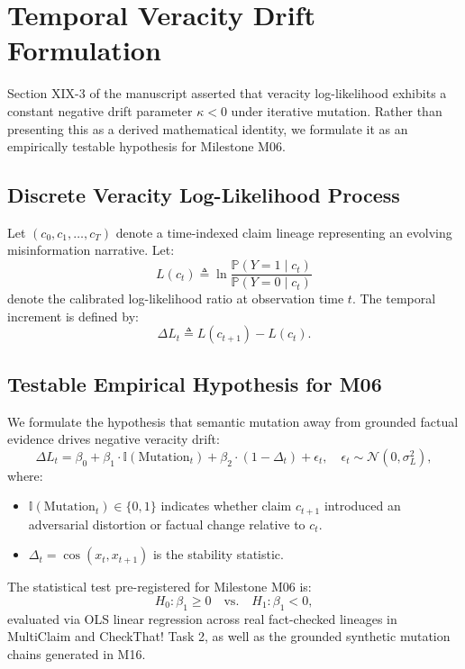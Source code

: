 \section{Temporal Veracity Drift Formulation}
\label{sec:drift_process}

Section XIX-3 of the manuscript asserted that veracity log-likelihood exhibits a constant negative drift parameter $\kappa < 0$ under iterative mutation. Rather than presenting this as a derived mathematical identity, we formulate it as an empirically testable hypothesis for Milestone M06.

\subsection{Discrete Veracity Log-Likelihood Process}
Let $(c_0, c_1, \dots, c_T)$ denote a time-indexed claim lineage representing an evolving misinformation narrative. Let:
\begin{equation}
L(c_t) \triangleq \ln \frac{\mathbb{P}(Y = 1 \mid c_t)}{\mathbb{P}(Y = 0 \mid c_t)}
\end{equation}
denote the calibrated log-likelihood ratio at observation time $t$. The temporal increment is defined by:
\begin{equation}
\Delta L_t \triangleq L(c_{t+1}) - L(c_t).
\end{equation}

\subsection{Testable Empirical Hypothesis for M06}
We formulate the hypothesis that semantic mutation away from grounded factual evidence drives negative veracity drift:
\begin{equation}
\label{eq:drift_regression}
\Delta L_t = \beta_0 + \beta_1 \cdot \mathbb{I}(\text{Mutation}_t) + \beta_2 \cdot (1 - \Delta_t) + \epsilon_t, \quad \epsilon_t \sim \mathcal{N}(0, \sigma_L^2),
\end{equation}
where:
\begin{itemize}
    \item $\mathbb{I}(\text{Mutation}_t) \in \{0, 1\}$ indicates whether claim $c_{t+1}$ introduced an adversarial distortion or factual change relative to $c_t$.
    \item $\Delta_t = \cos(x_t, x_{t+1})$ is the stability statistic.
\end{itemize}
The statistical test pre-registered for Milestone M06 is:
\begin{equation}
H_0: \beta_1 \ge 0 \quad \text{vs.} \quad H_1: \beta_1 < 0,
\end{equation}
evaluated via OLS linear regression across real fact-checked lineages in MultiClaim and CheckThat! Task 2, as well as the grounded synthetic mutation chains generated in M16.
